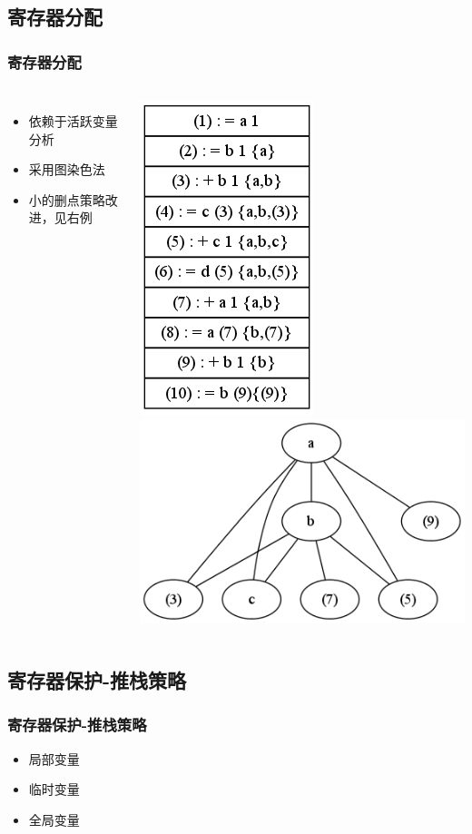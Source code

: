 \documentclass{beamer}
\begin{document}
\subsection{寄存器分配}
\begin{frame}
	\frametitle{寄存器分配}
	\begin{columns}
	\begin{itemize}
		\item 依赖于活跃变量分析
		\item 采用图染色法
		\item 小的删点策略改进，见右例
	\end{itemize}
	\includegraphics[scale=0.3]{register_allocation_triple.png}
	\includegraphics[scale=0.3]{interference_graph.png}
	\end{columns}
\end{frame}
\subsection{寄存器保护-推栈策略}
\begin{frame}
	\frametitle{寄存器保护-推栈策略}
	\begin{itemize}
		\item 局部变量
		\item 临时变量
		\item 全局变量
	\end{itemize}
\end{frame}
\end{document}
